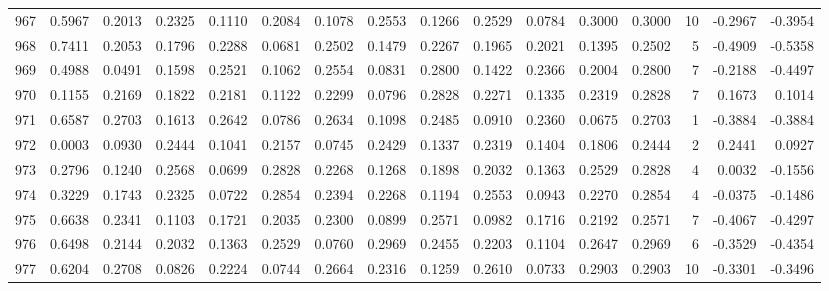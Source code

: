 \begin{tabular}{lrrrrrrrrrrrrrrr}
967 &      0.5967 &  0.2013 &  0.2325 &  0.1110 &  0.2084 &  0.1078 &  0.2553 &  0.1266 &  0.2529 &  0.0784 &   0.3000 &     0.3000 &     10 &                   -0.2967 &                    -0.3954 \\
968 &      0.7411 &  0.2053 &  0.1796 &  0.2288 &  0.0681 &  0.2502 &  0.1479 &  0.2267 &  0.1965 &  0.2021 &   0.1395 &     0.2502 &      5 &                   -0.4909 &                    -0.5358 \\
969 &      0.4988 &  0.0491 &  0.1598 &  0.2521 &  0.1062 &  0.2554 &  0.0831 &  0.2800 &  0.1422 &  0.2366 &   0.2004 &     0.2800 &      7 &                   -0.2188 &                    -0.4497 \\
970 &      0.1155 &  0.2169 &  0.1822 &  0.2181 &  0.1122 &  0.2299 &  0.0796 &  0.2828 &  0.2271 &  0.1335 &   0.2319 &     0.2828 &      7 &                    0.1673 &                     0.1014 \\
971 &      0.6587 &  0.2703 &  0.1613 &  0.2642 &  0.0786 &  0.2634 &  0.1098 &  0.2485 &  0.0910 &  0.2360 &   0.0675 &     0.2703 &      1 &                   -0.3884 &                    -0.3884 \\
972 &      0.0003 &  0.0930 &  0.2444 &  0.1041 &  0.2157 &  0.0745 &  0.2429 &  0.1337 &  0.2319 &  0.1404 &   0.1806 &     0.2444 &      2 &                    0.2441 &                     0.0927 \\
973 &      0.2796 &  0.1240 &  0.2568 &  0.0699 &  0.2828 &  0.2268 &  0.1268 &  0.1898 &  0.2032 &  0.1363 &   0.2529 &     0.2828 &      4 &                    0.0032 &                    -0.1556 \\
974 &      0.3229 &  0.1743 &  0.2325 &  0.0722 &  0.2854 &  0.2394 &  0.2268 &  0.1194 &  0.2553 &  0.0943 &   0.2270 &     0.2854 &      4 &                   -0.0375 &                    -0.1486 \\
975 &      0.6638 &  0.2341 &  0.1103 &  0.1721 &  0.2035 &  0.2300 &  0.0899 &  0.2571 &  0.0982 &  0.1716 &   0.2192 &     0.2571 &      7 &                   -0.4067 &                    -0.4297 \\
976 &      0.6498 &  0.2144 &  0.2032 &  0.1363 &  0.2529 &  0.0760 &  0.2969 &  0.2455 &  0.2203 &  0.1104 &   0.2647 &     0.2969 &      6 &                   -0.3529 &                    -0.4354 \\
977 &      0.6204 &  0.2708 &  0.0826 &  0.2224 &  0.0744 &  0.2664 &  0.2316 &  0.1259 &  0.2610 &  0.0733 &   0.2903 &     0.2903 &     10 &                   -0.3301 &                    -0.3496 \\

\end{tabular}
